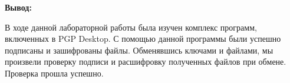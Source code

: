 \documentclass[a4paper,14pt]{extarticle}
\begin{document}
    \textbf{Вывод:} \par
    В ходе данной лабораторной работы была изучен комплекс программ, включенных
    в PGP Desktop. С помощью данной программы были успешно подписаны и \linebreak 
    зашифрованы файлы. Обменявшись ключами и файлами, мы произвели проверку 
    подписи и расшифровку полученных файлов при обмене. Проверка прошла успешно.
\end{document}
